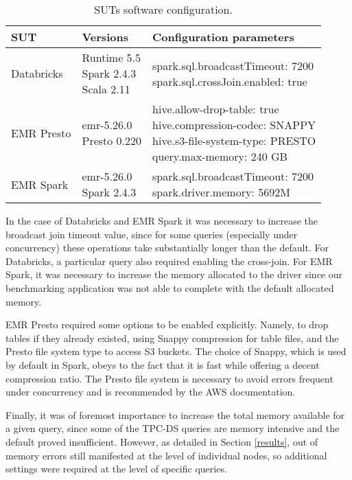 \begin{table}
  \centering
	\begin{tabular}{|l|l|l|}
	  \hline
		\textbf{SUT} & \textbf{Versions} & \textbf{Configuration parameters} \\ \hline
		Databricks & \makecell[l]{Runtime 5.5 \\ Spark 2.4.3 \\ Scala 2.11} & \makecell[l]{spark.sql.broadcastTimeout: 7200 \\ spark.sql.crossJoin.enabled: true} \\ \hline
		EMR Presto & \makecell[l]{emr-5.26.0 \\ Presto 0.220} & \makecell[l]{hive.allow-drop-table: true \\ hive.compression-codec: SNAPPY \\ hive.s3-file-system-type: PRESTO \\ query.max-memory: 240 GB} \\ \hline
		EMR Spark & \makecell[l]{emr-5.26.0 \\ Spark 2.4.3} & \makecell[l]{spark.sql.broadcastTimeout: 7200 \\ spark.driver.memory: 5692M} \\ \hline 
	\end{tabular}
	\caption{SUTs software configuration.}
	\label{table:softwareConf}
\end{table}

In the case of Databricks and EMR Spark it was necessary to increase the broadcast join timeout value, since for some queries (especially under concurrency) these operations take substantially longer than the default. For Databricks, a particular query also required enabling the cross-join. For EMR Spark, it was necessary to increase the memory allocated to the driver since our benchmarking application was not able to complete with the default allocated memory.

EMR Presto required some options to be enabled explicitly. Namely, to drop tables if they already existed, using Snappy compression for table files, and the Presto file system type to access S3 buckets. The choice of Snappy, which is used by default in Spark, obeys to the fact that it is fast while offering a decent compression ratio. The Presto file system is necessary to avoid errors frequent under concurrency and is recommended by the AWS documentation.

Finally, it was of foremost importance to increase the total memory available for a given query, since some of the TPC-DS queries are memory intensive and the default proved insufficient. However, as detailed in Section \ref{results}, out of memory errors still manifested at the level of individual nodes, so additional settings were required at the level of specific queries.



